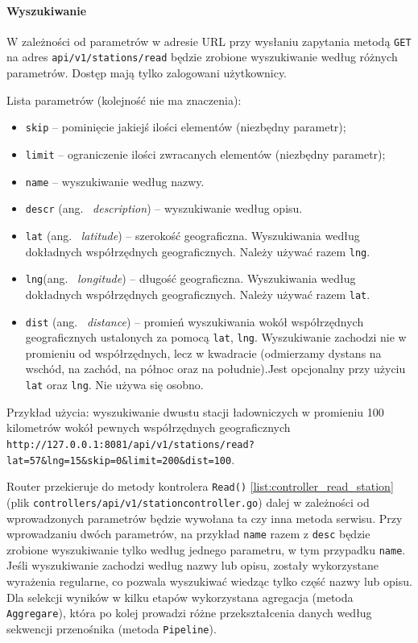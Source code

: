 \paragraph{Wyszukiwanie}
W zależności od parametrów w adresie URL przy wysłaniu zapytania metodą \texttt{GET} na adres \texttt{api/v1/stations/read} będzie zrobione wyszukiwanie według różnych parametrów.
Dostęp mają tylko zalogowani użytkownicy.

Lista parametrów (kolejność nie ma znaczenia):
\begin{itemize}
    \item \texttt{skip} -- pominięcie jakiejś ilości elementów (niezbędny parametr);
    \item \texttt{limit} -- ograniczenie ilości zwracanych elementów (niezbędny parametr);
    \item \texttt{name} -- wyszukiwanie według nazwy.
    \item \texttt{descr} (ang. ~\emph{description}) -- wyszukiwanie według opisu.
    \item \texttt{lat} (ang. ~\emph{latitude}) -- szerokość geograficzna. Wyszukiwania według dokładnych współrzędnych geograficznych. Należy używać razem \texttt{lng}.
    \item \texttt{lng}(ang. ~\emph{longitude}) -- długość geograficzna. Wyszukiwania według dokładnych współrzędnych geograficznych. Należy używać razem \texttt{lat}.
    \item \texttt{dist} (ang. ~\emph{distance}) -- promień wyszukiwania wokół współrzędnych geograficznych ustalonych za pomocą \texttt{lat}, \texttt{lng}. Wyszukiwanie zachodzi nie w promieniu od współrzędnych, lecz w kwadracie (odmierzamy dystans na wschód, na zachód, na północ oraz na południe).Jest opcjonalny przy użyciu \texttt{lat} oraz \texttt{lng}. Nie używa się osobno.
\end{itemize}

Przykład użycia: wyszukiwanie dwustu stacji ładowniczych w promieniu 100 kilometrów wokół pewnych współrzędnych geograficznych \texttt{http://127.0.0.1:8081/api/v1/stations/read?lat=57\&lng=15\&skip=0\&limit=200\&dist=100}.

Router przekieruje do metody kontrolera \texttt{Read()} \ref{list:controller_read_station} (plik \texttt{controllers/api/v1/stationcontroller.go}) dalej w zależności od wprowadzonych parametrów będzie wywołana ta czy inna metoda serwisu.
Przy wprowadzaniu dwóch parametrów, na przykład \texttt{name} razem z \texttt{desc} będzie zrobione wyszukiwanie tylko według jednego parametru, w tym przypadku \texttt{name}. Jeśli wyszukiwanie zachodzi według nazwy lub opisu, zostały wykorzystane wyrażenia regularne, co pozwala wyszukiwać wiedząc tylko część nazwy lub opisu.
Dla selekcji wyników w kilku etapów wykorzystana agregacja (metoda \texttt{Aggregare}), która po kolej prowadzi różne przekształcenia danych według sekwencji przenośnika (metoda \texttt{Pipeline}).

